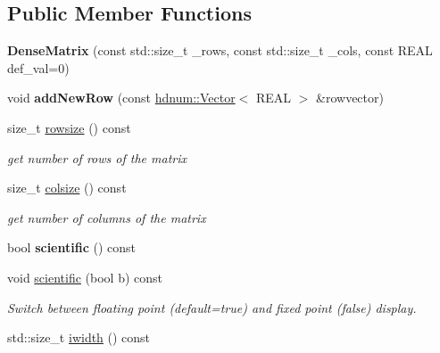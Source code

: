 \subsection*{Public Member Functions}
\begin{DoxyCompactItemize}
\item 
\hypertarget{classhdnum_1_1DenseMatrix_aa8aebe927f62a0f8f9728225cbdf8f82}{
{\bfseries DenseMatrix} (const std::size\_\-t \_\-rows, const std::size\_\-t \_\-cols, const REAL def\_\-val=0)}
\label{classhdnum_1_1DenseMatrix_aa8aebe927f62a0f8f9728225cbdf8f82}

\item 
\hypertarget{classhdnum_1_1DenseMatrix_a628d1da6da24e801560d14d8b7c672a4}{
void {\bfseries addNewRow} (const \hyperlink{classhdnum_1_1Vector}{hdnum::Vector}$<$ REAL $>$ \&rowvector)}
\label{classhdnum_1_1DenseMatrix_a628d1da6da24e801560d14d8b7c672a4}

\item 
size\_\-t \hyperlink{classhdnum_1_1DenseMatrix_aa5cc4ed9e7ccaafa1d9396ded5e7189b}{rowsize} () const 
\begin{DoxyCompactList}\small\item\em get number of rows of the matrix \item\end{DoxyCompactList}\item 
size\_\-t \hyperlink{classhdnum_1_1DenseMatrix_ac120c9c3beacb257ea9a8596079bfe4c}{colsize} () const 
\begin{DoxyCompactList}\small\item\em get number of columns of the matrix \item\end{DoxyCompactList}\item 
\hypertarget{classhdnum_1_1DenseMatrix_ac3efbe4dfe52f76b40a83be56ccfe13a}{
bool {\bfseries scientific} () const }
\label{classhdnum_1_1DenseMatrix_ac3efbe4dfe52f76b40a83be56ccfe13a}

\item 
void \hyperlink{classhdnum_1_1DenseMatrix_afef39f0ff9f8ade07b226172b425fb2f}{scientific} (bool b) const 
\begin{DoxyCompactList}\small\item\em Switch between floating point (default=true) and fixed point (false) display. \item\end{DoxyCompactList}\item 
\hypertarget{classhdnum_1_1DenseMatrix_a569e06e19a7f8789677bda6c80b62a79}{
std::size\_\-t \hyperlink{classhdnum_1_1DenseMatrix_a569e06e19a7f8789677bda6c80b62a79}{iwidth} () const }
\label{classhdnum_1_1DenseMatrix_a569e06e19a7f8789677bda6c80b62a79}


\end{DoxyCompactItemize}
